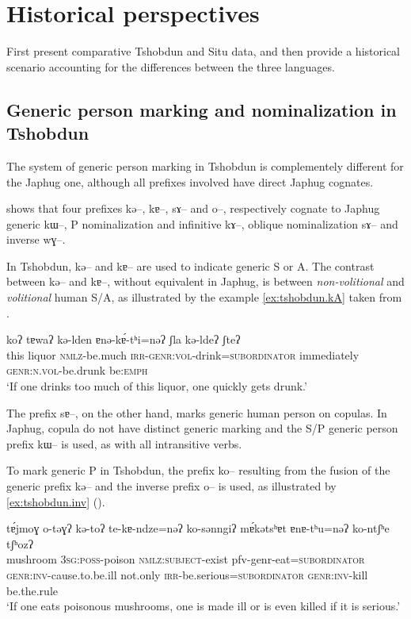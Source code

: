 \documentclass[oldfontcommands,oneside,a4paper,11pt]{article}
\newcommand{\ipa}[1]{{\phon \mbox{#1}}} %
\begin{document}
\section{Historical perspectives}
First present comparative Tshobdun and Situ data, and then provide a historical scenario accounting for the differences between the three languages.

\subsection{Generic person marking and nominalization in Tshobdun} \label{tshobdun.genr}
The system of generic person marking in Tshobdun is complementely different for the Japhug one, although all prefixes involved have direct Japhug cognates.

\citet{sun14generic} shows that four prefixes \ipa{kə--}, \ipa{kɐ--}, \ipa{sɤ--} and \ipa{o--}, respectively cognate to Japhug generic  \ipa{kɯ--}, P nominalization and infinitive \ipa{kɤ--}, oblique nominalization \ipa{sɤ--} and inverse \ipa{wɣ--}. 

In Tshobdun, \ipa{kə--} and \ipa{kɐ--} are used to indicate generic S or A. The contrast between \ipa{kə--} and \ipa{kɐ--}, without equivalent in Japhug, is between 	 \textit{non-volitional} and  \textit{volitional} human S/A, as illustrated by the   example \ref{ex:tshobdun.kA} taken from \citet[238]{sun14generic}.
 \begin{exe}
\ex \label{ex:tshobdun.kA}
\gll
\ipa{koʔ}  	\ipa{tɐwaʔ}  	\ipa{kə-lden}  	\ipa{ɐnə-kɐ́-tʰi=nəʔ}  	\ipa{ʃla}  	\ipa{kə-ldeʔ}  	\ipa{ʃteʔ}   \\
 this liquor \textsc{nmlz}-be.much \textsc{irr-genr:vol}-drink=\textsc{subordinator}  immediately \textsc{genr:n.vol}-be.drunk be:\textsc{emph} \\
\glt  ‘If one drinks too much of this liquor, one quickly gets drunk.’ 
 \end{exe}
 
 The prefix \ipa{sɐ--}, on the other hand, marks generic human person on copulas. In Japhug, copula do not have distinct generic marking and the S/P generic person prefix \ipa{kɯ--} is used, as with all intransitive verbs.
 
To mark generic P in Tshobdun, the prefix \ipa{ko--} resulting from the  fusion  of  the generic prefix \ipa{kə--} and the inverse prefix \ipa{o--} is used, as illustrated by \ref{ex:tshobdun.inv} (\citealt[240]{sun14generic}).

 \begin{exe}
\ex \label{ex:tshobdun.inv}
\gll
\ipa{tɐ́jmoɣ}  	\ipa{o-təɣʔ}  	\ipa{kə-toʔ}  	\ipa{te-kɐ-ndze=nəʔ}  	\ipa{ko-sənngiʔ}  	\ipa{mɐ́kətsʰɐt}  	\ipa{ɐnɐ-tʰu=nəʔ}  	\ipa{ko-ntʃʰe}  	\ipa{tʃʰozʔ}  \\
 mushroom \textsc{3sg:poss}-poison \textsc{nmlz:subject}-exist pfv-genr-eat=\textsc{subordinator}  \textsc{genr:inv}-cause.to.be.ill not.only \textsc{irr}-be.serious=\textsc{subordinator}   \textsc{genr:inv}-kill be.the.rule \\
\glt ‘If one eats poisonous mushrooms, one is made ill or is even killed if it is serious.’ 
 \end{exe}
 
\end{document}
